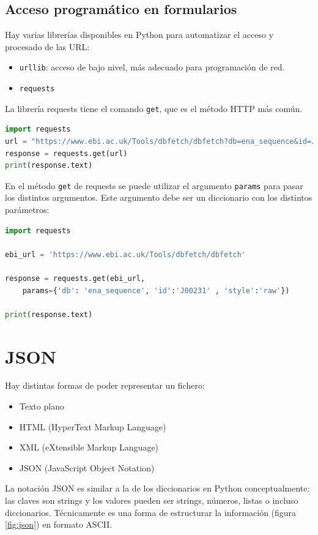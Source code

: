 \subsection{Acceso programático en formularios}
Hay varias librerías disponibles en Python para automatizar el acceso y procesado de las URL:
\begin{itemize}
\item \texttt{urllib}: acceso de bajo nivel, más adecuado para programación de red.
\item \texttt{requests}
\end{itemize}

La librería requests tiene el comando \texttt{get}, que es el método HTTP más común. 
\begin{lstlisting}[language=Python]
import requests
url = "https://www.ebi.ac.uk/Tools/dbfetch/dbfetch?db=ena_sequence&id=J00231&style=raw"
response = requests.get(url)
print(response.text)
\end{lstlisting}

En el método \texttt{get} de requests se puede utilizar el argumento \texttt{params} para pasar los distintos argumentos. Este argumento debe ser un diccionario con los distintos parámetros:
\begin{lstlisting}[language=Python]
import requests

ebi_url = 'https://www.ebi.ac.uk/Tools/dbfetch/dbfetch'

response = requests.get(ebi_url,
    params={'db': 'ena_sequence', 'id':'J00231' , 'style':'raw'})

print(response.text)
\end{lstlisting}

\section{JSON}
Hay distintas formas de poder representar un fichero:
\begin{itemize}
\item Texto plano
\item HTML (HyperText Markup Language)
\item XML (eXtensible Markup Language)
\item JSON (JavaScript Object Notation)
\end{itemize}

La notación JSON es similar a la de los diccionarios en Python conceptualmente: las claves son strings y los valores pueden ser strings, números, listas o incluso diccionarios. Técnicamente es una forma de estructurar la información (figura \ref{fig:json}) en formato ASCII. 


